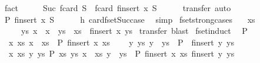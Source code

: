\begin{isabellebody}
\ fact\isanewline
\ \ \isamarkupfalse%
\ \isamarkupfalse%
\ {\isachardoublequoteopen}Suc\ {\isacharparenleft}fcard\ S{\isacharparenright}\ {\isacharequal}\ fcard\ {\isacharparenleft}finsert\ x\ S{\isacharparenright}{\isachardoublequoteclose}\isanewline
\ \ \ \ \isamarkupfalse%
\ transfer\ auto\isanewline
\ \ \isamarkupfalse%
\ \isamarkupfalse%
\ {\isachardoublequoteopen}P\ {\isacharparenleft}finsert\ x\ S{\isacharparenright}{\isachardoublequoteclose}\isanewline
\ \ \ \ \isamarkupfalse%
\ h\ card{\isacharunderscore}fset{\isacharunderscore}Suc{\isacharunderscore}case\ \isamarkupfalse%
\ simp\isanewline
{}\isamarkupfalse%
%
\endisatagproof
{\isafoldproof}%
%
\isadelimproof
\isanewline
%
\endisadelimproof
\isanewline
{}\isamarkupfalse%
\ fset{\isacharunderscore}strong{\isacharunderscore}cases{\isacharcolon}\isanewline
\ \ \ {\isachardoublequoteopen}xs\ {\isacharequal}\ {\isacharbraceleft}{\isacharbar}{\isacharbar}{\isacharbraceright}{\isachardoublequoteclose}\isanewline
\ \ \ \ {\isacharbar}\ ys\ x\ \ {\isachardoublequoteopen}x\ {\isacharbar}{\isasymnotin}{\isacharbar}\ ys{\isachardoublequoteclose}\ \ {\isachardoublequoteopen}xs\ {\isacharequal}\ finsert\ x\ ys{\isachardoublequoteclose}\isanewline
%
\isadelimproof
%
\endisadelimproof
%
\isatagproof
{}\isamarkupfalse%
\ transfer\ blast%
\endisatagproof
{\isafoldproof}%
%
\isadelimproof
\isanewline
%
\endisadelimproof
\isanewline
{}\isamarkupfalse%
\ fset{\isacharunderscore}induct{}{\isacharcolon}\isanewline
\ \ {\isachardoublequoteopen}P\ {\isacharbraceleft}{\isacharbar}{\isacharbar}{\isacharbraceright}\ {\isacharbraceleft}{\isacharbar}{\isacharbar}{\isacharbraceright}\ {\isasymLongrightarrow}\isanewline
\ \ {\isacharparenleft}{\isasymAnd}x\ xs{\isachardot}\ x\ {\isacharbar}{\isasymnotin}{\isacharbar}\ xs\ {\isasymLongrightarrow}\ P\ {\isacharparenleft}finsert\ x\ xs{\isacharparenright}\ {\isacharbraceleft}{\isacharbar}{\isacharbar}{\isacharbraceright}{\isacharparenright}\ {\isasymLongrightarrow}\isanewline
\ \ {\isacharparenleft}{\isasymAnd}y\ ys{\isachardot}\ y\ {\isacharbar}{\isasymnotin}{\isacharbar}\ ys\ {\isasymLongrightarrow}\ P\ {\isacharbraceleft}{\isacharbar}{\isacharbar}{\isacharbraceright}\ {\isacharparenleft}finsert\ y\ ys{\isacharparenright}{\isacharparenright}\ {\isasymLongrightarrow}\isanewline
\ \ {\isacharparenleft}{\isasymAnd}x\ xs\ y\ ys{\isachardot}\ {\isasymlbrakk}P\ xs\ ys{\isacharsemicolon}\ x\ {\isacharbar}{\isasymnotin}{\isacharbar}\ xs{\isacharsemicolon}\ y\ {\isacharbar}{\isasymnotin}{\isacharbar}\ ys{\isasymrbrakk}\ {\isasymLongrightarrow}\ P\ {\isacharparenleft}finsert\ x\ xs{\isacharparenright}\ {\isacharparenleft}finsert\ y\ ys{\isacharparenright}{\isacharparenright}\ {\isasymLongrightarrow}\isanewline

\end{isabellebody}
